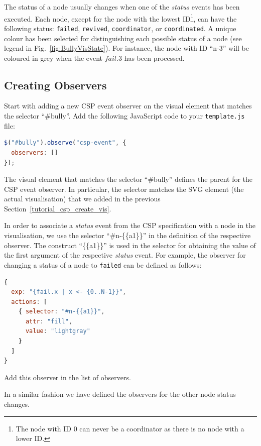 The status of a node usually changes when one of the \textit{status} events has been executed.
Each node, except for the node with the lowest ID\footnote{The node with ID 0 can never be a coordinator as there is no node with a lower ID.}, can have the following status: \texttt{failed}, \texttt{revived}, \texttt{coordinator}, or \texttt{coordinated}.
A unique colour has been selected for distinguishing each possible status of a node (see legend in Fig.~\ref{fig:BullyVisState}).
For instance, the node with ID ``n-3'' will be coloured in grey when the event $fail.3$ has been processed.

\subsection{Creating Observers}

Start with adding a new CSP event observer on the visual element that matches the selector ``\#bully''.
Add the following JavaScript code to your \texttt{template.js} file:

\begin{lstlisting}[language=JavaScript]
$("#bully").observe("csp-event", {
  observers: []
});
\end{lstlisting}

The visual element that matches the selector ``\#bully'' defines the parent for the CSP event observer.
In particular, the selector matches the SVG element (the actual visualisation) that we added in the previous Section~\ref{tutorial_csp_create_vis}.

In order to associate a \textit{status} event from the CSP specification with a node in the visualisation, we use the selector ``\#n-\{\{a1\}\}'' in the definition of the respective observer. The construct ``\{\{a1\}\}'' is used in the selector for obtaining the value of the first argument of the respective \textit{status} event.
For example, the observer for changing a status of a node to \texttt{failed} can be defined as follows:

\begin{lstlisting}[language=JavaScript]
{
  exp: "{fail.x | x <- {0..N-1}}",
  actions: [
    { selector: "#n-{{a1}}",
      attr: "fill",
      value: "lightgray"
    }
  ]
}
\end{lstlisting}

Add this observer in the list of observers.

In a similar fashion we have defined the observers for the other node status changes. 

